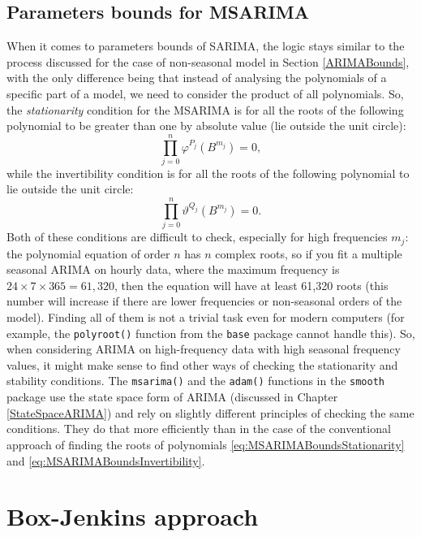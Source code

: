 \documentclass[]{book}
\theoremstyle{definition}
\theoremstyle{definition}
\theoremstyle{definition}
\theoremstyle{definition}
\theoremstyle{remark}
\begin{document}
\hypertarget{MSARIMABounds}{%
\subsection{Parameters bounds for MSARIMA}\label{MSARIMABounds}}

When it comes to parameters bounds of SARIMA, the logic stays similar to the process discussed for the case of non-seasonal model in Section \ref{ARIMABounds}, with the only difference being that instead of analysing the polynomials of a specific part of a model, we need to consider the product of all polynomials. So, the \emph{stationarity} condition for the MSARIMA is for all the roots of the following polynomial to be greater than one by absolute value (lie outside the unit circle):
\begin{equation}
  \prod_{j=0}^n \varphi^{P_j}(B^{m_j}) = 0,
  \label{eq:MSARIMABoundsStationarity}
\end{equation}
while the invertibility condition is for all the roots of the following polynomial to lie outside the unit circle:
\begin{equation}
  \prod_{j=0}^n \vartheta^{Q_j}(B^{m_j}) = 0.
  \label{eq:MSARIMABoundsInvertibility}
\end{equation}
Both of these conditions are difficult to check, especially for high frequencies \(m_j\): the polynomial equation of order \(n\) has \(n\) complex roots, so if you fit a multiple seasonal ARIMA on hourly data, where the maximum frequency is \(24\times 7\times 365 = 61,320\), then the equation will have at least 61,320 roots (this number will increase if there are lower frequencies or non-seasonal orders of the model). Finding all of them is not a trivial task even for modern computers (for example, the \texttt{polyroot()} function from the \texttt{base} package cannot handle this). So, when considering ARIMA on high-frequency data with high seasonal frequency values, it might make sense to find other ways of checking the stationarity and stability conditions. The \texttt{msarima()} and the \texttt{adam()} functions in the \texttt{smooth} package use the state space form of ARIMA (discussed in Chapter \ref{StateSpaceARIMA}) and rely on slightly different principles of checking the same conditions. They do that more efficiently than in the case of the conventional approach of finding the roots of polynomials \eqref{eq:MSARIMABoundsStationarity} and \eqref{eq:MSARIMABoundsInvertibility}.

\hypertarget{BJApproach}{%
\section{Box-Jenkins approach}\label{BJApproach}}
\end{document}
